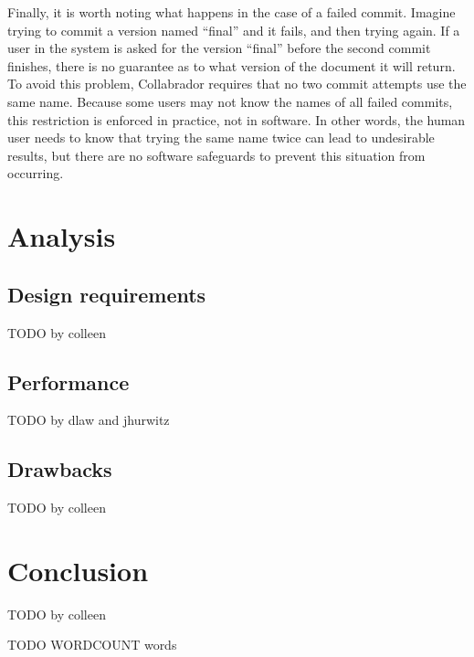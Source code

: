 \documentclass[11pt,titlepage]{article}
\begin{document}
Finally, it is worth noting what happens in the case of a failed commit. Imagine trying to commit a version named ``final'' and it fails, and then trying again. If a user in the system is asked for the version ``final'' before the second commit finishes, there is no guarantee as to what version of the document it will return. To avoid this problem, Collabrador requires that no two commit attempts use the same name. Because some users may not know the names of all failed commits, this restriction is enforced in practice, not in software. In other words, the human user needs to know that trying the same name twice can lead to undesirable results, but there are no software safeguards to prevent this situation from occurring.

\section{Analysis}

\subsection{Design requirements}

TODO by colleen

\subsection{Performance}

TODO by dlaw and jhurwitz

\subsection{Drawbacks}

TODO by colleen

\section{Conclusion}

TODO by colleen




TODO WORDCOUNT words
\end{document}
